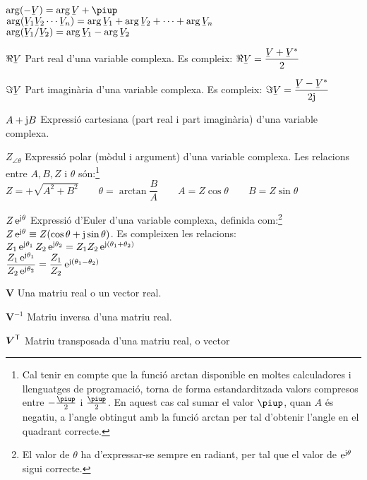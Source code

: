 \begin{list}{}
      $\arg(-\cmplx{V}) =  \arg\cmplx{V} + \piup$\\[1ex]
      $\arg(\cmplx{V}_1 \cmplx{V}_2 \cdots \cmplx{V}_n) = \arg\cmplx{V}_1 + \arg \cmplx{V}_2 + \cdots + \arg\cmplx{V}_n$\\[1ex]
      $\arg(\cmplx{V}_1 / \cmplx{V}_2) = \arg\cmplx{V}_1 - \arg \cmplx{V}_2$
    \item[$\Re\cmplx{V}$] Part real d'una variable complexa. Es compleix: $\Re\cmplx{V} = \dfrac{\cmplx{V} + \cmplx{V}^*}{2}$
    \item[$\Im\cmplx{V}$] Part imaginària d'una variable complexa. Es compleix: $\Im\cmplx{V} = \dfrac{\cmplx{V} - \cmplx{V}^*}{2 \ju}$
    \item[$A+\mathrm{j} B$] Expressió cartesiana (part real i part
    imaginària) d'una variable complexa.
    \item[$Z_{\angle \theta}$] Expressió polar (mòdul i argument) d'una variable
    complexa. Les relacions entre $A, B, Z$ i $\theta$ són:\footnote{Cal tenir en compte que la funció \textsf{arctan} disponible en moltes calculadores i llenguatges de programació, torna de forma  estandarditzada valors compresos entre $-\frac{\piup}{2}$ i $\frac{\piup}{2}$. En aquest cas cal sumar el valor $\piup$, quan $A$ és negatiu, a l'angle obtingut amb la funció \textsf{arctan} per tal d'obtenir l'angle en el quadrant correcte.}\\[1ex]
    $Z=+\sqrt{A^2+B^2}\quad\quad\theta=\arctan{\dfrac{B}{A}}\quad\quad
    A=Z\cos\theta\quad\quad B=Z\sin\theta$
    \item[$Z\,\mathrm{e}^{\mathrm{j}\theta}$] Expressió d'Euler d'una variable complexa, definida com:\footnote{El valor de $\theta$ ha d'expressar-se sempre en radiant, per tal que el valor de $\mathrm{e}^{\mathrm{j}\theta}$ sigui correcte.}
     $Z\,\mathrm{e}^{\mathrm{j}\theta} \equiv Z(\cos\theta+\mathrm{j}\sin\theta)$.
     Es compleixen les relacions:\\[1ex]
     $Z_1\,\mathrm{e}^{\mathrm{j}\theta_1} \, Z_2\,\mathrm{e}^{\mathrm{j}\theta_2} = Z_1 Z_2\,\mathrm{e}^{\mathrm{j}(\theta_1+\theta_2)}$\\[1ex]
     $\dfrac{Z_1\,\mathrm{e}^{\mathrm{j}\theta_1}}{Z_2\,\mathrm{e}^{\mathrm{j}\theta_2}} = \dfrac{Z_1}{Z_2}\,\mathrm{e}^{\mathrm{j}(\theta_1-\theta_2)}$
    \item[$\boldsymbol{V}$] Una matriu real o un vector real.
    \item[$\boldsymbol{V}^{-1}$] Matriu inversa d'una matriu real.
    \item[$\boldsymbol{V}^\mathrm{\textsf{T}}$] Matriu transposada d'una matriu real, o vector

\end{list}
